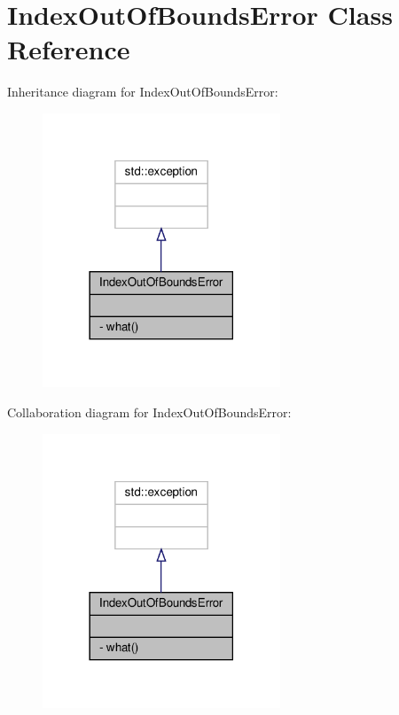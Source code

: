 \hypertarget{classIndexOutOfBoundsError}{}\section{Index\+Out\+Of\+Bounds\+Error Class Reference}
\label{classIndexOutOfBoundsError}


Inheritance diagram for Index\+Out\+Of\+Bounds\+Error\+:
\nopagebreak
\begin{figure}[H]
\begin{center}
\leavevmode
\includegraphics[width=201pt]{classIndexOutOfBoundsError__inherit__graph}
\end{center}
\end{figure}


Collaboration diagram for Index\+Out\+Of\+Bounds\+Error\+:
\nopagebreak
\begin{figure}[H]
\begin{center}
\leavevmode
\includegraphics[width=201pt]{classIndexOutOfBoundsError__coll__graph}
\end{center}
\end{figure}
